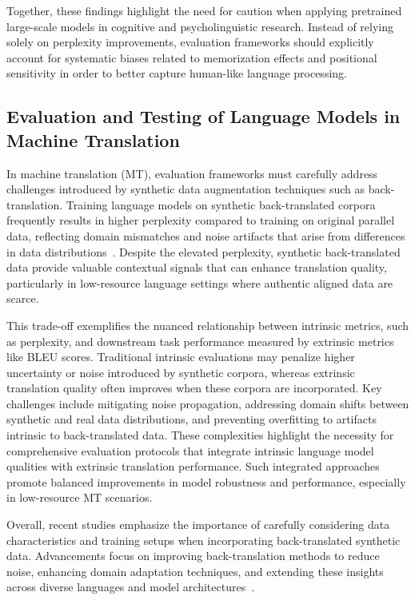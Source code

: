 \documentclass[sigconf]{acmart}
\begin{document}
Together, these findings highlight the need for caution when applying pretrained large-scale models in cognitive and psycholinguistic research. Instead of relying solely on perplexity improvements, evaluation frameworks should explicitly account for systematic biases related to memorization effects and positional sensitivity in order to better capture human-like language processing.

\subsection{Evaluation and Testing of Language Models in Machine Translation}

In machine translation (MT), evaluation frameworks must carefully address challenges introduced by synthetic data augmentation techniques such as back-translation. Training language models on synthetic back-translated corpora frequently results in higher perplexity compared to training on original parallel data, reflecting domain mismatches and noise artifacts that arise from differences in data distributions~\cite{ref37}. Despite the elevated perplexity, synthetic back-translated data provide valuable contextual signals that can enhance translation quality, particularly in low-resource language settings where authentic aligned data are scarce.

This trade-off exemplifies the nuanced relationship between intrinsic metrics, such as perplexity, and downstream task performance measured by extrinsic metrics like BLEU scores. Traditional intrinsic evaluations may penalize higher uncertainty or noise introduced by synthetic corpora, whereas extrinsic translation quality often improves when these corpora are incorporated. Key challenges include mitigating noise propagation, addressing domain shifts between synthetic and real data distributions, and preventing overfitting to artifacts intrinsic to back-translated data. These complexities highlight the necessity for comprehensive evaluation protocols that integrate intrinsic language model qualities with extrinsic translation performance. Such integrated approaches promote balanced improvements in model robustness and performance, especially in low-resource MT scenarios.

Overall, recent studies emphasize the importance of carefully considering data characteristics and training setups when incorporating back-translated synthetic data. Advancements focus on improving back-translation methods to reduce noise, enhancing domain adaptation techniques, and extending these insights across diverse languages and model architectures~\cite{ref37}.
\end{document}
